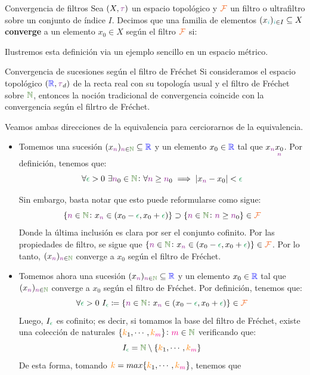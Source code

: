 \documentclass[titlepage,11pt,a4paper]{book}
\newcommand{\NN}{\ensuremath{\textcolor{OliveGreen}{\mathbb{N}}}}
\newcommand{\RR}{\ensuremath{\textcolor{blue}{\mathbb{R}}}}
\newcommand{\filt}{\ensuremath{\textcolor{Orange}{\mathcal{F}}}}
\newcommand{\ii}{\ensuremath{\textcolor{TealBlue}{i}}}
\newcommand{\nn}{\ensuremath{\textcolor{Plum}{n}}}
\newcommand{\mm}{\ensuremath{\textcolor{Magenta}{m}}}
\newcommand{\eps}{\textcolor{ForestGreen}{\epsilon}}
\newcommand{\taut}{\textcolor{Fuchsia}{\tau}}
\newcommand{\kk}{\textcolor{orange}{k}}
\newcommand{\borde}[1]{%
  \begingroup
  \setlength{\fboxsep}{2.5pt}%
  \setlength{\fboxrule}{1pt}%
  \textcolor{black}{\fbox{\normalcolor\ensuremath{#1}}}%
  \hspace{4pt}%
  \vspace{0.5 pt}
  \endgroup
}
\begin{document}
     \begin{defn*}{Convergencia de filtros}
     Sea $(X, \taut)$ un espacio topológico y $\filt$ un filtro o ultrafiltro sobre un conjunto de índice $I$. Decimos que una familia de elementos $(x_{\ii})_{\ii \in I} \subseteq X$ \textbf{converge} a un elemento $x_{0} \in X$ según el filtro $\filt$ si:
    \begin{center}
        \borde{\forall V \in \mathcal{N}_{x_{0}}  \ \{\ii \in I \colon x_{\ii} \in V\} \in \filt}
    \end{center}
     
     \end{defn*}

     \medskip
     Ilustremos esta definición via un ejemplo sencillo en un espacio métrico.

     \begin{ejemplo*}{Convergencia de sucesiones según el filtro de Fréchet}
        Si consideramos el espacio topológico $(\RR, \taut_{d})$ de la recta real con su topología usual y el filtro de Fréchet sobre $\NN$, entonces la noción tradicional de convergencia coincide con la convergencia según el filrtro de Fréchet.

        \smallskip
        Veamos ambas direcciones de la equivalencia  para cerciorarnos de la equivalencia.
        \begin{itemize}
            \item[$\bullet$] Tomemos una sucesión $(x_{\nn})_{\nn \in \NN} \subseteq \RR$ y un elemento $x_{0} \in \RR$ tal que $x_{\nn} \underset{\nn}{x_{0}}$. Por definición, tenemos que:
             $$\forall \eps > 0 \ \exists \nn_{0} \in \NN \colon \forall \nn \geq \nn_{0} \implies |x_{\nn} - x_{0}| < \eps$$

             Sin embargo, basta notar que esto puede reformularse como sigue:
             $$
             \{\nn \in \NN \colon x_{\nn} \in (x_{0} - \eps, x_{0} + \eps)\} \supset \{\nn \in \NN \colon \nn \geq \nn_{0}\} \in \filt
             $$
             Donde la última inclusión es clara por ser el conjunto cofinito. Por las propiedades de filtro, se sigue que $\{\nn \in \NN \colon x_{\nn} \in (x_{0} - \eps, x_{0} + \eps)\} \in \filt$. Por lo tanto, $(x_{\nn})_{\nn \in \NN}$ converge a $x_{0}$ según el filtro de Fréchet.

             \item[$\bullet$] Tomemos ahora una sucesión $(x_{\nn})_{\nn \in \NN} \subseteq \RR$ y un elemento $x_{0} \in \RR$ tal que $(x_{\nn})_{\nn \in \NN}$ converge a $x_{0}$ según el filtro de Fréchet. Por definición, tenemos que:
             $$
             \forall \eps > 0 \ I_{\eps} \coloneq \{\nn \in \NN \colon x_{\nn} \in (x_{0} - \eps, x_{0} + \eps)\} \in \filt
             $$
             Luego, $I_{\eps}$ es cofinito; es decir, si tomamos la base del filtro de Fréchet, existe una colección de naturales $\{\kk_{1}, \cdots , \kk_{\mm}\} \colon \mm \in \NN$ verificando que:
             $$
                I_{\eps}  = \NN \setminus \{\kk_{1}, \cdots, \kk_{\mm}\}
             $$
             De esta forma, tomando $\kk = max\{\kk_{1}, \cdots, \kk_{\mm}\}$, tenemos que 
             

\end{itemize}
\end{ejemplo*}
\end{document}
